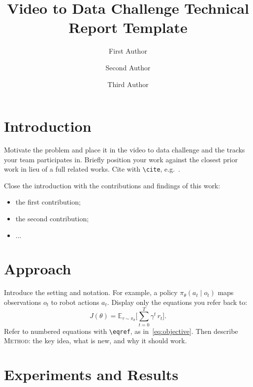 \documentclass[10pt]{nvidiaextabstract}
\title{Video to Data Challenge Technical Report Template}
\author[1]{First Author}
\author[1]{Second Author}
\author[2]{Third Author}
\affil[1]{NVIDIA}
\affil[2]{University Name}
\affil[ ]{\texttt{\{first,second\}@nvidia.com}, \texttt{third@university.edu}}
\newcommand{\method}{\textsc{Method}\xspace}
\begin{document}
\maketitle


\section{Introduction}
\label{sec:intro}

Motivate the problem and place it in the video to data challenge and the
tracks your team participates in. Briefly position your work against the
closest prior work in lieu of a full related works. Cite with
\verb|\cite|, e.g.~\cite{Lam94}.

Close the introduction with the contributions and findings of this work:
\begin{itemize}
  \item the first contribution;
  \item the second contribution;
  \item ...
\end{itemize}


\section{Approach}
\label{sec:approach}

Introduce the setting and notation. For example, a policy
$\pi_\theta(a_t \mid o_t)$ maps observations $o_t$ to robot actions $a_t$.
Display only the equations you refer back to:
%
\begin{equation}
\label{eq:objective}
J(\theta) = \mathbb{E}_{\tau \sim \pi_\theta}
  \Big[ \sum_{t=0}^{T} \gamma^{t} \, r_t \Big].
\end{equation}
%
Refer to numbered equations with \verb|\eqref|, as in~\eqref{eq:objective}.
Then describe \method: the key idea, what is new, and why it should work.


\section{Experiments and Results}
\label{sec:experiments}
\end{document}
